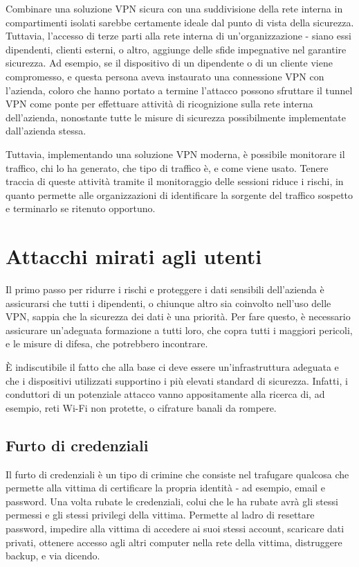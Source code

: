 Combinare una soluzione VPN sicura con una suddivisione della rete interna in compartimenti isolati sarebbe certamente ideale dal punto di vista della sicurezza.
Tuttavia, l'accesso di terze parti alla rete interna di un'organizzazione - siano essi dipendenti, clienti esterni, o altro, aggiunge delle sfide impegnative nel garantire sicurezza.
Ad esempio, se il dispositivo di un dipendente o di un cliente viene compromesso, e questa persona aveva instaurato una connessione VPN con l'azienda, coloro che hanno portato a termine l'attacco possono sfruttare il tunnel VPN come ponte per effettuare attività di ricognizione sulla rete interna dell'azienda, nonostante tutte le misure di sicurezza possibilmente implementate dall'azienda stessa.

Tuttavia, implementando una soluzione VPN moderna, è possibile monitorare il traffico, chi lo ha generato, che tipo di traffico è, e come viene usato. Tenere traccia di queste attività tramite il monitoraggio delle sessioni riduce i rischi, in quanto permette alle organizzazioni di identificare la sorgente del traffico sospetto e terminarlo se ritenuto opportuno.

\section{Attacchi mirati agli utenti}

Il primo passo per ridurre i rischi e proteggere i dati sensibili dell'azienda è assicurarsi che tutti i dipendenti, o chiunque altro sia coinvolto nell'uso delle VPN, sappia che la sicurezza dei dati è una priorità.
Per fare questo, è necessario assicurare un'adeguata formazione a tutti loro, che copra tutti i maggiori pericoli, e le misure di difesa, che potrebbero incontrare.

È indiscutibile il fatto che alla base ci deve essere un'infrastruttura adeguata e che i dispositivi utilizzati supportino i più elevati standard di sicurezza. Infatti, i conduttori di un potenziale attacco vanno appositamente alla ricerca di, ad esempio, reti Wi-Fi non protette, o cifrature banali da rompere.

\subsection{Furto di credenziali}
Il furto di credenziali è un tipo di crimine che consiste nel trafugare qualcosa che permette alla vittima di certificare la propria identità - ad esempio, email e password.
Una volta rubate le credenziali, colui che le ha rubate avrà gli stessi permessi e gli stessi privilegi della vittima.
Permette al ladro di resettare password, impedire alla vittima di accedere ai suoi stessi account, scaricare dati privati, ottenere accesso agli altri computer nella rete della vittima, distruggere backup, e via dicendo.

